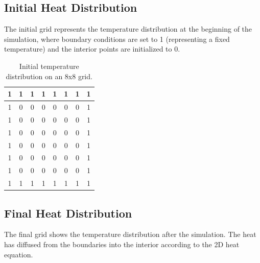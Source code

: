 \documentclass[11pt]{article}
\begin{document}
        \subsection{Initial Heat Distribution}
    The initial grid represents the temperature distribution at the beginning of the simulation, where boundary conditions are set to 1 (representing a fixed temperature) and the interior points are initialized to 0.

    \begin{table}[ht]
        \centering
        \begin{tabular}{|c|c|c|c|c|c|c|c|}
            \hline
            1 & 1 & 1 & 1 & 1 & 1 & 1 & 1 \\
            \hline
            1 & 0 & 0 & 0 & 0 & 0 & 0 & 1 \\
            \hline
            1 & 0 & 0 & 0 & 0 & 0 & 0 & 1 \\
            \hline
            1 & 0 & 0 & 0 & 0 & 0 & 0 & 1 \\
            \hline
            1 & 0 & 0 & 0 & 0 & 0 & 0 & 1 \\
            \hline
            1 & 0 & 0 & 0 & 0 & 0 & 0 & 1 \\
            \hline
            1 & 0 & 0 & 0 & 0 & 0 & 0 & 1 \\
            \hline
            1 & 1 & 1 & 1 & 1 & 1 & 1 & 1 \\
            \hline
        \end{tabular}
        \caption{Initial temperature distribution on an 8x8 grid.}
        \label{table:initial_grid}
    \end{table}

    \subsection{Final Heat Distribution}
    The final grid shows the temperature distribution after the simulation. The heat has diffused from the boundaries into the interior according to the 2D heat equation.
\end{document}

